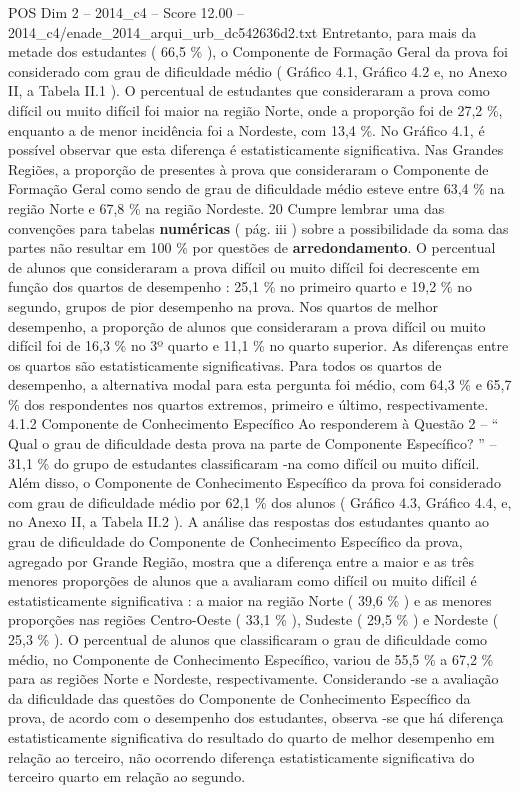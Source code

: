\begin{textsample}{POS Dim 2 – 2014\_c4 – Score 12.00 – 2014\_c4/enade\_2014\_arqui\_urb\_dc542636d2.txt}
Entretanto, para mais da metade dos estudantes ( 66,5 \% ), o Componente de Formação Geral da prova foi considerado com grau de dificuldade médio ( Gráfico 4.1, Gráfico 4.2 e, no Anexo II, a Tabela II.1 ).
O percentual de estudantes que consideraram a prova como difícil ou muito difícil foi maior na região Norte, onde a proporção foi de 27,2 \%, enquanto a de menor incidência foi a Nordeste, com 13,4 \%.
No Gráfico 4.1, é possível observar que esta diferença é estatisticamente significativa.
Nas Grandes Regiões, a proporção de presentes à prova que consideraram o Componente de Formação Geral como sendo de grau de dificuldade médio esteve entre 63,4 \% na região Norte e 67,8 \% na região Nordeste. 20 Cumpre lembrar uma das convenções para tabelas \textbf{numéricas} ( pág. iii ) sobre a possibilidade da soma das partes não resultar em 100 \% por questões de \textbf{arredondamento}.
O percentual de alunos que consideraram a prova difícil ou muito difícil foi decrescente em função dos quartos de desempenho : 25,1 \% no primeiro quarto e 19,2 \% no segundo, grupos de pior desempenho na prova.
Nos quartos de melhor desempenho, a proporção de alunos que consideraram a prova difícil ou muito difícil foi de 16,3 \% no 3º quarto e 11,1 \% no quarto superior.
As diferenças entre os quartos são estatisticamente significativas.
Para todos os quartos de desempenho, a alternativa modal para esta pergunta foi médio, com 64,3 \% e 65,7 \% dos respondentes nos quartos extremos, primeiro e último, respectivamente. 4.1.2 Componente de Conhecimento Específico Ao responderem à Questão 2 – “ Qual o grau de dificuldade desta prova na parte de Componente Específico? ” – 31,1 \% do grupo de estudantes classificaram -na como difícil ou muito difícil.
Além disso, o Componente de Conhecimento Específico da prova foi considerado com grau de dificuldade médio por 62,1 \% dos alunos ( Gráfico 4.3, Gráfico 4.4, e, no Anexo II, a Tabela II.2 ).
A análise das respostas dos estudantes quanto ao grau de dificuldade do Componente de Conhecimento Específico da prova, agregado por Grande Região, mostra que a diferença entre a maior e as três menores proporções de alunos que a avaliaram como difícil ou muito difícil é estatisticamente significativa : a maior na região Norte ( 39,6 \% ) e as menores proporções nas regiões Centro-Oeste ( 33,1 \% ), Sudeste ( 29,5 \% ) e Nordeste ( 25,3 \% ).
O percentual de alunos que classificaram o grau de dificuldade como médio, no Componente de Conhecimento Específico, variou de 55,5 \% a 67,2 \% para as regiões Norte e Nordeste, respectivamente.
Considerando -se a avaliação da dificuldade das questões do Componente de Conhecimento Específico da prova, de acordo com o desempenho dos estudantes, observa -se que há diferença estatisticamente significativa do resultado do quarto de melhor desempenho em relação ao terceiro, não ocorrendo diferença estatisticamente significativa do terceiro quarto em relação ao segundo.

\end{textsample}
